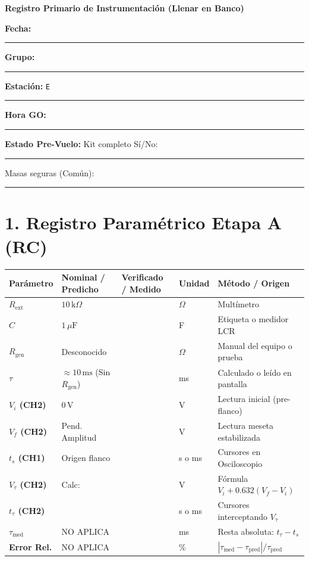 \documentclass[11pt, a4paper]{article}
\begin{document}
\begin{tcolorbox}[colback=ucbblue!5!white, colframe=ucbblue, title=\textbf{Artefacto A2: Hoja de Datos Físicos y Control de Rotación}]
    \centering \textbf{Registro Primario de Instrumentación (Llenar en Banco)}
\end{tcolorbox}

\textbf{Fecha:} \rule{2.5cm}{0.4pt} \quad \textbf{Grupo:} \rule{1.5cm}{0.4pt} \quad \textbf{Estación:} \texttt{E}\rule{1cm}{0.4pt} \quad \textbf{Hora GO:} \rule{2.5cm}{0.4pt}

\vspace{0.1cm}
\textbf{Estado Pre-Vuelo:} Kit completo Sí/No: \rule{1.5cm}{0.4pt} \quad Masas seguras (Común): \rule{1.5cm}{0.4pt}

\section*{1. Registro Paramétrico Etapa A (RC)}
\renewcommand{\arraystretch}{1.5}
\noindent
\begin{tabularx}{\textwidth}{
  >{\bfseries\RaggedRight\hsize=0.9\hsize}X 
  >{\centering\arraybackslash\hsize=1.0\hsize}X 
  >{\centering\arraybackslash\hsize=1.0\hsize}X 
  >{\centering\arraybackslash\hsize=0.6\hsize}X 
  >{\RaggedRight\arraybackslash\hsize=1.5\hsize}X}
\toprule
\textbf{Parámetro} & \textbf{Nominal / Predicho} & \textbf{Verificado / Medido} & \textbf{Unidad} & \textbf{Método / Origen} \\
\midrule
$R_{\text{ext}}$ & $10\,\text{k}\Omega$ & & $\Omega$ & Multímetro \\ \addlinespace
$C$ & $1\,\mu\text{F}$ & & F & Etiqueta o medidor LCR \\ \addlinespace
$R_{\text{gen}}$ & Desconocido & & $\Omega$ & Manual del equipo o prueba \\ \addlinespace
$\tau$ & $\approx 10\,\text{ms}$ (Sin $R_{\text{gen}}$) & & ms & Calculado o leído en pantalla \\ \addlinespace
$V_i$ (CH2) & $0\,\text{V}$ & & V & Lectura inicial (pre-flanco) \\ \addlinespace
$V_f$ (CH2) & Pend. Amplitud & & V & Lectura meseta estabilizada \\ \addlinespace
$t_s$ (CH1) & Origen flanco & & s o ms & Cursores en Osciloscopio \\ \addlinespace
$V_{\tau}$ (CH2) & Calc: & & V & Fórmula $V_i + 0.632(V_f - V_i)$ \\ \addlinespace
$t_{\tau}$ (CH2) & & & s o ms & Cursores interceptando $V_{\tau}$ \\ \addlinespace
$\tau_{\text{med}}$ & NO APLICA & & ms & Resta absoluta: $t_{\tau} - t_s$ \\ \addlinespace
Error Rel. & NO APLICA & & \% & $| \tau_{\text{med}} - \tau_{\text{pred}} | / \tau_{\text{pred}}$ \\
\bottomrule
\end{tabularx}
\end{document}
